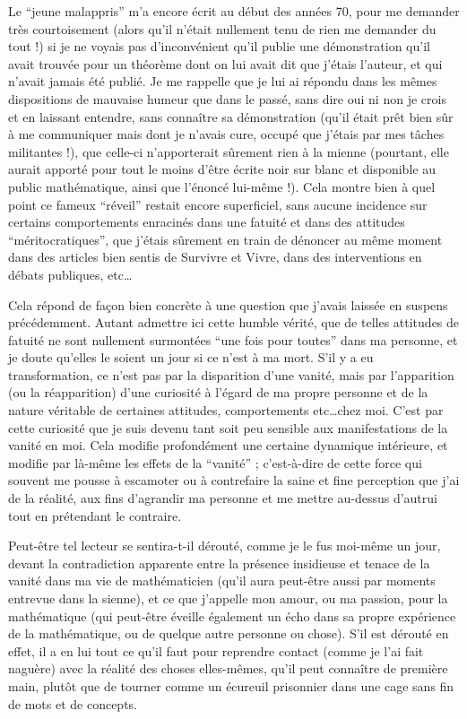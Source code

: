 Le ``jeune malappris'' m'a encore écrit au début des années 70, pour me demander très courtoisement (alors qu'il n'était nullement tenu de rien me demander du tout !) si je ne voyais pas d'inconvénient qu'il publie une démonstration qu'il avait trouvée pour un théorème dont on lui avait dit que j'étais l'auteur, et qui n'avait jamais été publié. Je me rappelle que je lui ai répondu dans les mêmes dispositions de mauvaise humeur que dans le passé, sans dire oui ni non je crois et en laissant entendre, sans connaître sa démonstration (qu'il était prêt bien sûr à me communiquer mais dont je n'avais cure, occupé que j'étais par mes tâches militantes !), que celle-ci n'apporterait sûrement rien à la mienne (pourtant, elle aurait apporté pour tout le moins d'être écrite noir sur blanc et disponible au public mathématique, ainsi que l'énoncé lui-même !). Cela montre bien à quel point ce fameux ``réveil'' restait encore superficiel, sans aucune incidence sur certains comportements enracinés dans une fatuité et dans des attitudes ``méritocratiques'', que j'étais sûrement en train de dénoncer au même moment dans des articles bien sentis de Survivre et Vivre, dans des interventions en débats publiques, etc\ldots

Cela répond de façon bien concrète à une question que j'avais laissée en suspens précédemment. Autant admettre ici cette humble vérité, que de telles attitudes de fatuité ne sont nullement surmontées ``une fois pour toutes'' dans ma personne, et je doute qu'elles le soient un jour si ce n'est à ma mort. S'il y a eu transformation, ce n'est pas par la disparition d'une vanité, mais par l'apparition (ou la réapparition) d'une curiosité à l'égard de ma propre personne et de la nature véritable de certaines attitudes, comportements etc\ldots chez moi. C'est par cette curiosité que je suis devenu tant soit peu sensible aux manifestations de la vanité en moi. Cela modifie profondément une certaine dynamique intérieure, et modifie par là-même les effets de la ``vanité'' ; c'est-à-dire de cette force qui souvent me pousse à escamoter ou à contrefaire la saine et fine perception que j'ai de la réalité, aux fins d'agrandir ma personne et me mettre au-dessus d'autrui tout en prétendant le contraire.

Peut-être tel lecteur se sentira-t-il dérouté, comme je le fus moi-même un jour, devant la contradiction apparente entre la présence insidieuse et tenace de la vanité dans ma vie de mathématicien (qu'il aura peut-être aussi par moments entrevue dans la sienne), et ce que j'appelle mon amour, ou ma passion, pour la mathématique (qui peut-être éveille également un écho dans sa propre expérience de la mathématique, ou de quelque autre personne ou chose). S'il est dérouté en effet, il a en lui tout ce qu'il faut pour reprendre contact (comme je l'ai fait naguère) avec la réalité des choses elles-mêmes, qu'il peut connaître de première main, plutôt que de tourner comme un écureuil prisonnier dans une cage sans fin de mots et de concepts.

